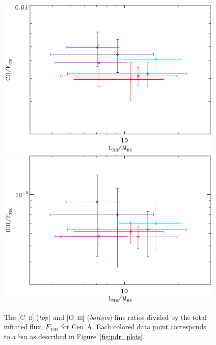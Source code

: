 \documentclass[preprint2]{aastex}
\begin{document}
\begin{figure}
\includegraphics[width=\columnwidth]{CenA_CIIonFtir_LtironMH2_plot_v1}
\includegraphics[width=\columnwidth]{CenA_OIIIonFtir_LtironMH2_plot_v1}
\caption{The [C~\textsc{ii}] (\emph{top}) and [O~\textsc{iii}] (\emph{bottom}) line ratios divided by the total infrared flux, $F_{\mathrm{TIR}}$ for Cen~A.  Each colored data point corresponds to a bin as described in Figure~\ref{fig:pdr_plots}.}
\label{fig:sfr}
\end{figure}
\end{document}
